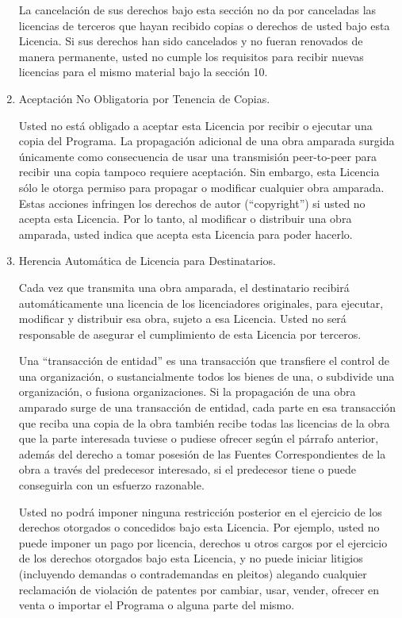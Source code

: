 \documentclass[11pt]{article}
\begin{document}
\begin{enumerate}
La cancelaci\'{o}n de sus derechos bajo esta secci\'{o}n no da por
canceladas las licencias de terceros que hayan recibido copias o
derechos de usted bajo esta Licencia.  Si sus derechos han sido
cancelados y no fueran renovados de manera permanente, usted no
cumple los requisitos para recibir nuevas licencias para el mismo
material bajo la secci\'{o}n 10.

\item Aceptaci\'{o}n No Obligatoria por Tenencia de Copias.

Usted no est\'{a} obligado a aceptar esta Licencia por recibir o
ejecutar una copia del Programa.  La propagaci\'{o}n adicional de una obra amparada surgida \'{u}nicamente como consecuencia de usar una transmisi\'{o}n peer-to-peer para recibir una copia tampoco requiere aceptaci\'{o}n.  Sin embargo, esta Licencia s\'{o}lo le otorga
permiso para propagar o modificar cualquier obra amparada.  Estas
acciones infringen los derechos de autor (``copyright'') si usted no acepta esta Licencia.  Por lo tanto, al modificar o distribuir una obra amparada, usted
indica que acepta esta Licencia para poder hacerlo.

\item Herencia Autom\'{a}tica de Licencia para Destinatarios.

Cada vez que transmita una obra amparada, el destinatario recibir\'{a} 
autom\'{a}ticamente una licencia de los licenciadores originales, para 
ejecutar, modificar y distribuir esa obra, sujeto a esa Licencia. 
Usted no ser\'{a} responsable de asegurar el cumplimiento de esta Licencia 
por terceros.

Una ``transacci\'{o}n de entidad'' es una transacci\'{o}n que transfiere el 
control de una organizaci\'{o}n, o sustancialmente todos los bienes de una, 
o subdivide una organizaci\'{o}n, o fusiona organizaciones. Si la 
propagaci\'{o}n de una obra amparado surge de una transacci\'{o}n de entidad, 
cada parte en esa transacci\'{o}n que reciba una copia de la obra tambi\'{e}n 
recibe todas las licencias de la obra que la parte interesada tuviese 
o pudiese ofrecer seg\'{u}n el p\'{a}rrafo anterior, adem\'{a}s del derecho a tomar 
posesi\'{o}n de las Fuentes Correspondientes de la obra a trav\'{e}s del 
predecesor interesado, si el predecesor tiene o puede conseguirla 
con un esfuerzo razonable.

Usted no podr\'{a} imponer ninguna restricci\'{o}n posterior en el ejercicio 
de los derechos otorgados o concedidos bajo esta Licencia. Por ejemplo, 
usted no puede imponer un pago por licencia, derechos u otros cargos 
por el ejercicio de los derechos otorgados bajo esta Licencia, y no 
puede iniciar litigios (incluyendo demandas o contrademandas en 
pleitos) alegando cualquier reclamaci\'{o}n de violaci\'{o}n de patentes por 
cambiar, usar, vender, ofrecer en venta o importar el Programa o 
alguna parte del mismo.


\end{enumerate}
\end{document}
